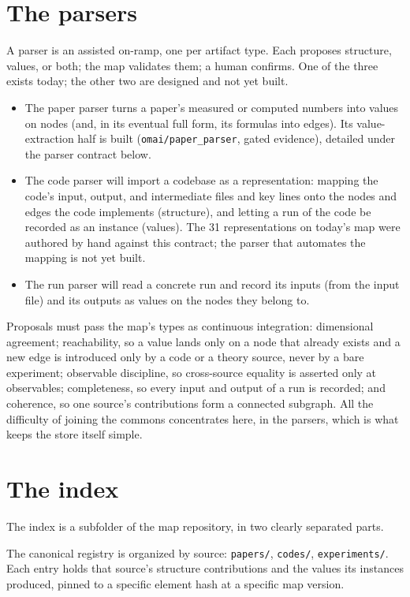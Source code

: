 \documentclass[11pt,a4paper]{article}
\begin{document}
\section{The parsers}

A parser is an assisted on-ramp, one per artifact type. Each proposes
structure, values, or both; the map validates them; a human confirms. One of the
three exists today; the other two are designed and not yet built.

\begin{itemize}[leftmargin=2em]
  \item The paper parser turns a paper's measured or computed numbers into values
  on nodes (and, in its eventual full form, its formulas into edges). Its
  value-extraction half is built (\texttt{omai/paper\_parser}, gated evidence),
  detailed under the parser contract below.
  \item The code parser will import a codebase as a representation: mapping the
  code's input, output, and intermediate files and key lines onto the nodes and
  edges the code implements (structure), and letting a run of the code be recorded
  as an instance (values). The 31 representations on today's map were authored by
  hand against this contract; the parser that automates the mapping is not yet
  built.
  \item The run parser will read a concrete run and record its inputs (from the
  input file) and its outputs as values on the nodes they belong to.
\end{itemize}

Proposals must pass the map's types as continuous integration: dimensional
agreement; reachability, so a value lands only on a node that already exists and
a new edge is introduced only by a code or a theory source, never by a bare
experiment; observable discipline, so cross-source equality is asserted only at
observables; completeness, so every input and output of a run is recorded; and
coherence, so one source's contributions form a connected subgraph. All the
difficulty of joining the commons concentrates here, in the parsers, which is
what keeps the store itself simple.

\section{The index}

The index is a subfolder of the map repository, in two clearly separated parts.

The canonical registry is organized by source: \texttt{papers/}, \texttt{codes/},
\texttt{experiments/}. Each entry holds that source's structure contributions and the
values its instances produced, pinned to a specific element hash at a specific
map version.
\end{document}
